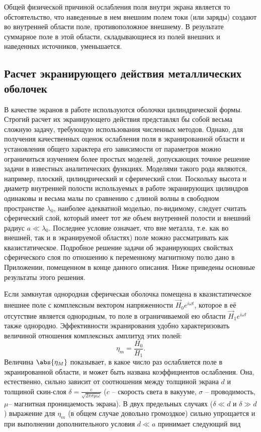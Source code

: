 Общей физической причиной ослабления поля внутри экрана является то обстоятельство, что наведенные в нем внешним полем токи (или заряды) создают во внутренней области поле, противоположное внешнему. В результате суммарное поле в этой области, складывающиеся из полей внешних и наведенных источников, уменьшается. 

\subsection{Расчет экранирующего действия металлических оболочек}%
\label{sub:2.2}

В качестве экранов в работе используются оболочки цилиндрической формы.
Строгий расчет их экранирующего действия представлял бы собой весьма сложную задачу, требующую использования численных методов. Однако, для получения качественных оценок ослабления поля в экранированной области и установления общего характера его зависимости от параметров можно ограничиться изучением более простых моделей, допускающих точное решение задачи в известных аналитических функциях. Моделями такого рода являются, например, плоский, цилиндрический и сферический слои. Поскольку высота и диаметр внутренней полости используемых в работе экранирующих цилиндров одинаковы и весьма малы по сравнению с длиной волны в свободном пространстве $\lambda_{0}$, наиболее адекватной моделью, по-видимому, следует считать сферический слой, который имеет тот же объем внутренней полости и внешний радиус $a\ll \lambda_{0}$. Последнее условие означает, что вне металла, т.е. как во внешней, так и в экранируемой областях) поле можно рассматривать как квазистатическое. Подробное решение задачи об экранирующих свойствах сферического слоя по отношению к переменному магнитному полю дано в Приложении, помещенном в конце данного описания.
Ниже приведены основные результаты этого решения.

Если замкнутая однородная сферическая оболочка помещена в квазистатическое внешнее поле с комплексным вектором напряженности $\vec H_{0} e^{i \omega t}$, которое в её отсутствие является однородным, то поле в ограничиваемой ею области $\vec H_{1} e^{i \omega t }$ также однородно. Эффективности экранирования удобно характеризовать величиной отношения комплексных амплитуд этих полей:
\begin{equation}
    \label{eq:1}
    \eta_m = \frac{H_{0}}{H_{1}}.
\end{equation}
Величина $\abs{ \eta_M}$ показывает, в какое число раз ослабляется поле в экранированной области, и может быть названа коэффициентов ослабления. Она, естественно, сильно зависит от соотношения между толщиной экрана $d$ и толщиной скин-слоя $\delta = \frac{c}{\sqrt{2\pi\sigma\mu\omega}}$ ($c$ -- скорость света в вакууме, $\sigma$ -- проводимость, $\mu$-- магнитная проницаемость экрана). В двух предельных случаях ($\delta\ll d$ и $\delta\gg d$ ) выражение для $\eta_m$ (в общем случае довольно громоздкое) сильно упрощается и при выполнении дополнительного условия $d\ll a$ принимает следующий вид
